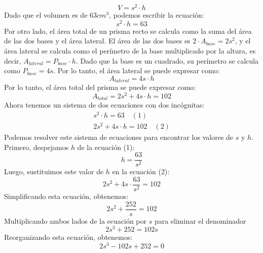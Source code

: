 \documentclass[a4paper]{article}
\begin{document}
\begin{enumerate}
    \begin{equation*}
        V = s^2 \cdot h
    \end{equation*}
    Dado que el volumen es de $63cm^3$, podemos escribir la ecuación:
    \begin{equation*}
        s^2 \cdot h = 63
    \end{equation*}
    Por otro lado, el área total de un prisma recto se calcula como la suma del área de las dos bases y el área lateral. El área de las dos bases es $2 \cdot A_{base} = 2s^2$, y el área lateral se calcula como el perímetro de la base multiplicado por la altura, es decir, $A_{lateral} = P_{base} \cdot h$. Dado que la base es un cuadrado, su perímetro se calcula como $P_{base} = 4s$. Por lo tanto, el área lateral se puede expresar como:
    \begin{equation*}
        A_{lateral} = 4s \cdot h
    \end{equation*}
    Por lo tanto, el área total del prisma se puede expresar como:
    \begin{equation*}
        A_{total} = 2s^2 + 4s \cdot h = 102
    \end{equation*}
    Ahora tenemos un sistema de dos ecuaciones con dos incógnitas:
    \begin{gather*}
        s^2 \cdot h = 63 \quad (1)\\
        2s^2 + 4s \cdot h = 102 \quad (2)
    \end{gather*}
    Podemos resolver este sistema de ecuaciones para encontrar los valores de $s$ y $h$. Primero, despejamos $h$ de la ecuación (1):
    \begin{equation*}
        h = \frac{63}{s^2}
    \end{equation*}
    Luego, sustituimos este valor de $h$ en la ecuación (2):
    \begin{equation*}
        2s^2 + 4s \cdot \frac{63}{s^2} = 102
    \end{equation*}
    Simplificando esta ecuación, obtenemos:
    \begin{equation*}
        2s^2 + \frac{252}{s} = 102
    \end{equation*}
    Multiplicando ambos lados de la ecuación por $s$ para eliminar el denominador
    \begin{equation*}
        2s^3 + 252 = 102s
    \end{equation*}
    Reorganizando esta ecuación, obtenemos:
    \begin{equation*}
        2s^3 - 102s + 252 = 0
    \end{equation*}

\end{enumerate}
\end{document}
